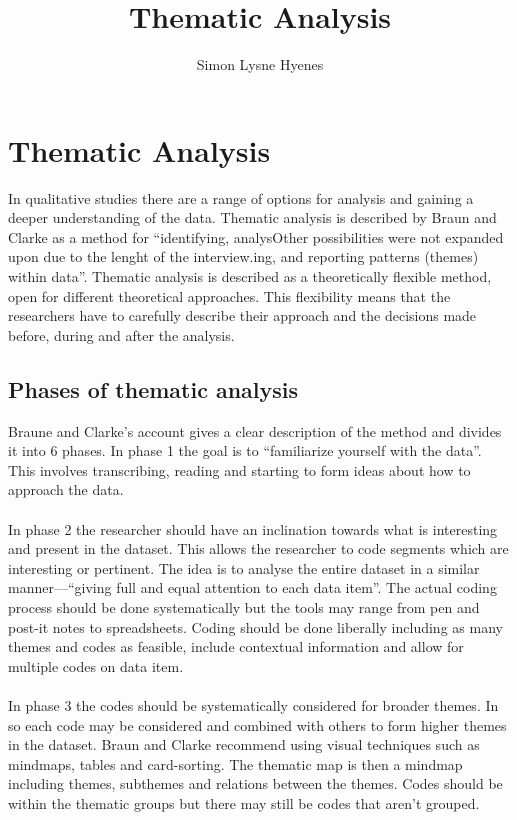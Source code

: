 \documentclass[11pt,UKenglish, a4paper]{article}
\author{Simon Lysne Hyenes}
\title{Thematic Analysis}
\begin{document}
\section{Thematic Analysis}
In qualitative studies there are a range of options for analysis and gaining a deeper understanding of the data. Thematic analysis is described by Braun and Clarke as a method for ``identifying, analysOther possibilities were not expanded upon due to the lenght of the interview.ing, and reporting patterns (themes) within data''\cite[p.79]{Braun2006Using}. Thematic analysis is described as a theoretically flexible method, open for different theoretical approaches. This flexibility means that the researchers have to carefully describe their approach and the decisions made before, during and after the analysis. 

\subsection{Phases of thematic analysis}
Braune and Clarke's account gives a clear description of the method and divides it into 6 phases. In phase 1 the goal is to ``familiarize yourself with the data''\cite[p.87]{Braun2006Using}. This involves transcribing, reading and starting to form ideas about how to approach the data. 

\paragraph{}In phase 2 the researcher should have an inclination towards what is interesting and present in the dataset. This allows the researcher to code segments which are interesting or pertinent. The idea is to analyse the entire dataset in a similar manner---``giving full and equal attention to each data item''\cite[p.89]{Braun2006Using}. The actual coding process should be done systematically but the tools may range from pen and post-it notes to spreadsheets. Coding should be done liberally including as many themes and codes as feasible, include contextual information and allow for multiple codes on data item\cite[p.89]{Braun2006Using}.

\paragraph{}In phase 3 the codes should be systematically considered for broader themes. In so each code may be considered and combined with others to form higher themes in the dataset. Braun and Clarke recommend using visual techniques such as mindmaps, tables and card-sorting. The thematic map is then a mindmap including themes, subthemes and relations between the themes. Codes should be within the thematic groups but there may still be codes that aren't grouped.
\end{document}
